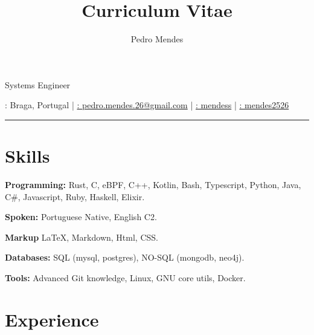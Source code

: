 \documentclass{article}
\makeatletter
\renewcommand{\maketitle}
{
    \begin{center}
        {\huge\bfseries\theauthor}

        \vspace{.25em}

        \Large{Systems Engineer}

        \vspace{.25em}

        \large{\thetitle}

        \vspace{.25em}

        \faMapMarker: Braga, Portugal |
        \href{mailto:pedro.mendes.26@gmail.com}{\faEnvelope: pedro.mendes.26@gmail.com} |
        \href{https://github.com/mendess}{\faGithub: mendess} |
        \href{https://www.linkedin.com/in/mendes2526/}{\faLinkedinSquare: mendes2526}

    \end{center}
}
\makeatother
\begin{document}
\title{Curriculum Vitae}
\author{Pedro Mendes}

\maketitle

\hrule

\section{Skills}

\begin{multicols}{2}

    \textbf{Programming:} Rust, C, eBPF, C++, Kotlin, Bash, Typescript, Python,
    Java, C\#, Javascript, Ruby, Haskell, Elixir.

    \textbf{Spoken:} Portuguese Native, English C2.

    \textbf{Markup} \LaTeX, Markdown, Html, CSS\@.

    \textbf{Databases:} SQL (mysql, postgres), NO-SQL (mongodb, neo4j).

    \textbf{Tools:} Advanced Git knowledge, Linux, GNU core utils, Docker.

\end{multicols}

\section{Experience}
\end{document}
